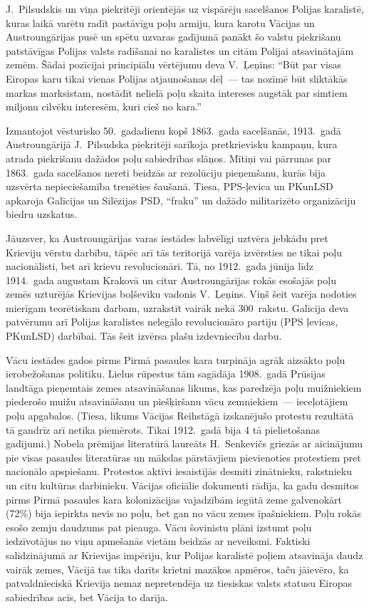 \documentclass[twoside,a5paper,12pt,fleqn,openany]{extbook}
\begin{document}
J.~Pilsudskis un viņa piekritēji orientējās uz vispārēju sacelšanos Polijas karalistē, kuras laikā varētu radīt pastāvīgu poļu armiju, kura karotu Vācijas un Austroungārijas pusē un spētu uzvaras gadījumā panākt šo valstu piekrišanu patstāvīgas Polijas valsts radīšanai no karalistes un citām Polijai atsavinātajām zemēm. Šādai pozīcijai principiālu vērtējumu deva V.~Ļeņins: ``Būt par visas Eiropas karu tikai vienas Polijas atjaunošanas dēļ~--- tas nozīmē būt sliktākās markas marksistam, nostādīt nelielā poļu skaita intereses augstāk par simtiem miljonu cilvēku interesēm, kuri cieš no kara.''

Izmantojot vēsturisko 50.~gadadienu kopš 1863.~gada sacelšanās, 1913.~gadā Austroungārijā J.~Pilsudska piekritēji sarīkoja pretkrievisku kampaņu, kura atrada piekrišanu dažādos poļu sabiedrības slāņos. Mītiņi vai pārrunas par 1863.~gada sacelšanos nereti beidzās ar rezolūciju pieņemšanu, kurās bija uzsvērta nepieciešamība trenēties šaušanā. Tiesa, PPS-ļevica un PKunLSD apkaroja Galīcijas un Silēzijas PSD, ``fraku'' un dažādo militarizēto organizāciju biedru uzskatus.

Jāuzsver, ka Austroungārijas varas iestādes labvēlīgi uztvēra jebkādu pret Krieviju vērstu darbību, tāpēc arī tās teritorijā varēja izvērsties ne tikai poļu nacionālisti, bet arī krievu revolucionāri. Tā, no 1912.~gada jūnija līdz 1914.~gada augustam Krakovā un citur Austroungārijas rokās esošajās poļu zemēs uzturējās Krievijas boļševiku vadonis V.~Ļeņins. Viņš šeit varēja nodoties mierīgam teorētiskam darbam, uzrakstīt vairāk nekā 300~rakstu. Galīcija deva patvērumu arī Polijas karalistes nelegālo revolucionāro partiju (PPS ļevicas, PKunLSD) darbībai. Tās šeit izvērsa plašu izdevniecību darbu.

Vācu iestādes  gados pirms Pirmā pasaules kara turpināja agrāk aizsākto poļu ierobežošanas politiku. Lielus rūpestus tām sagādāja 1908.~gadā Prūsijas landtāga pieņemtais zemes atsavināšanas likums, kas paredzēja poļu muižniekiem piederošo muižu atsavināšanu un piešķiršanu vācu zemniekiem~--- ieceļotājiem poļu apgabalos. (Tiesa, likums Vācijas Reihstāgā izskanējušo protestu rezultātā tā gandrīz arī netika piemērots. Tikai 1912.~gadā bija 4 tā pielietošanas gadījumi.) Nobela prēmijas literatūrā laureāts H.~Senkevičs griezās ar aicinājumu pie visas pasaules literatūras un mākslas pārstāvjiem pievienoties protestiem pret nacionālo apspiešanu. Protestos aktīvi iesaistījās desmiti zinātnieku, rakstnieku un citu kultūras darbinieku. Vācijas oficiālie dokumenti rādīja, ka gadu desmitos pirms Pirmā pasaules kara kolonizācijas vajadzībām iegūtā zeme galvenokārt (72\%) bija iepirkta nevis no poļu, bet gan no vācu zemes īpašniekiem. Poļu rokās esošo zemju daudzums pat pieauga. Vācu šovinistu plāni izstumt poļu iedzīvotājus no viņu apmešanās vietām beidzās ar neveiksmi. Faktiski salīdzinājumā ar Krievijas impēriju, kur Polijas karalistē poļiem atsavināja daudz vairāk zemes, Vācijā tas tika darīts krietni mazākos apmēros, taču jāievēro, ka patvaldnieciskā Krievija nemaz nepretendēja uz tiesiskas valsts statusu Eiropas sabiedrības acīs, bet Vācija to darīja.
\end{document}
